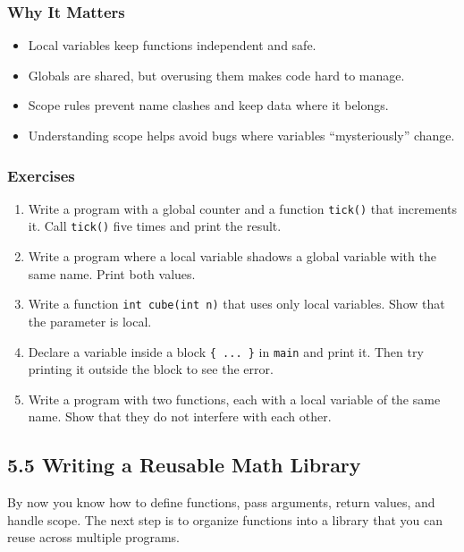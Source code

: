 \documentclass[
  letterpaper,
  DIV=11,
  numbers=noendperiod]{scrreprt}
\providecommand{\tightlist}{%
  \setlength{\itemsep}{0pt}\setlength{\parskip}{0pt}}
\begin{document}
\subsubsection{Why It Matters}\label{why-it-matters-22}

\begin{itemize}
\tightlist
\item
  Local variables keep functions independent and safe.
\item
  Globals are shared, but overusing them makes code hard to manage.
\item
  Scope rules prevent name clashes and keep data where it belongs.
\item
  Understanding scope helps avoid bugs where variables ``mysteriously''
  change.
\end{itemize}

\subsubsection{Exercises}\label{exercises-23}

\begin{enumerate}
\def\labelenumi{\arabic{enumi}.}
\tightlist
\item
  Write a program with a global counter and a function \texttt{tick()}
  that increments it. Call \texttt{tick()} five times and print the
  result.
\item
  Write a program where a local variable shadows a global variable with
  the same name. Print both values.
\item
  Write a function \texttt{int\ cube(int\ n)} that uses only local
  variables. Show that the parameter is local.
\item
  Declare a variable inside a block \texttt{\{\ ...\ \}} in
  \texttt{main} and print it. Then try printing it outside the block to
  see the error.
\item
  Write a program with two functions, each with a local variable of the
  same name. Show that they do not interfere with each other.
\end{enumerate}

\subsection{5.5 Writing a Reusable Math
Library}\label{writing-a-reusable-math-library}

By now you know how to define functions, pass arguments, return values,
and handle scope. The next step is to organize functions into a library
that you can reuse across multiple programs.
\end{document}
